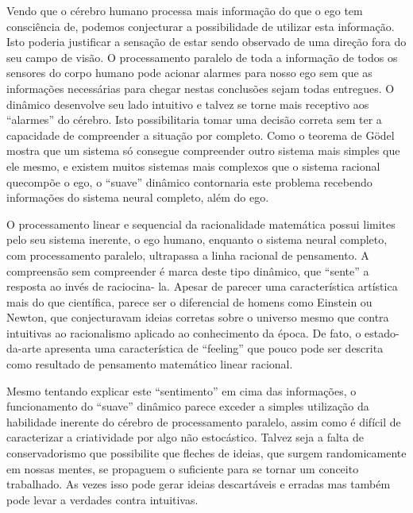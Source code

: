 \documentclass[14pt,portuguese]{extreport}
\begin{document}
      Vendo que o cérebro humano processa mais informação do que o
      ego tem consciência de, podemos conjecturar a possibilidade de utilizar
      esta informação. Isto poderia justificar a sensação de estar sendo
      observado de uma direção fora do seu campo de visão. O
      processamento paralelo de toda a informação de todos os sensores do
      corpo humano pode acionar alarmes para nosso ego sem que as
      informações necessárias para chegar nestas conclusões sejam todas
      entregues. O dinâmico desenvolve seu lado intuitivo e talvez se torne
      mais receptivo aos “alarmes” do cérebro. Isto possibilitaria tomar uma
      decisão correta sem ter a capacidade de compreender a situação por
      completo. Como o teorema de Gödel mostra que um sistema só
      consegue compreender outro sistema mais simples que ele mesmo, e
      existem muitos sistemas mais complexos que o sistema racional quecompõe o ego, o “suave” dinâmico contornaria este problema
      recebendo informações do sistema neural completo, além do ego.
      
      O processamento linear e sequencial da racionalidade matemática
      possui limites pelo seu sistema inerente, o ego humano, enquanto o
      sistema neural completo, com processamento paralelo, ultrapassa a
      linha racional de pensamento. A compreensão sem compreender é
      marca deste tipo dinâmico, que “sente” a resposta ao invés de raciocina-
      la. Apesar de parecer uma característica artística mais do que científica,
      parece ser o diferencial de homens como Einstein ou Newton, que
      conjecturavam ideias corretas sobre o universo mesmo que contra
      intuitivas ao racionalismo aplicado ao conhecimento da época. De fato,
      o estado-da-arte apresenta uma característica de “feeling” que pouco
      pode ser descrita como resultado de pensamento matemático linear
      racional.
      
      Mesmo tentando explicar este “sentimento” em cima das
      informações, o funcionamento do “suave” dinâmico parece exceder a
      simples utilização da habilidade inerente do cérebro de processamento
      paralelo, assim como é difícil de caracterizar a criatividade por algo não
      estocástico. Talvez seja a falta de conservadorismo que possibilite que
      fleches de ideias, que surgem randomicamente em nossas mentes, se
      propaguem o suficiente para se tornar um conceito trabalhado. As vezes
      isso pode gerar ideias descartáveis e erradas mas também pode levar a
      verdades contra intuitivas.
    
\end{document}
